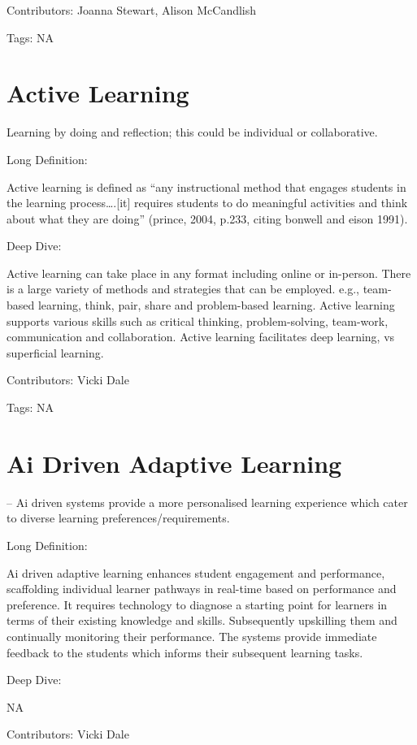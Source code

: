 \documentclass[
  letterpaper,
  DIV=11,
  numbers=noendperiod]{scrreprt}
\begin{document}
Contributors: Joanna Stewart, Alison McCandlish

Tags: NA

\section{Active Learning}\label{active-learning}

Learning by doing and reflection; this could be individual or
collaborative.

Long Definition:

Active learning is defined as ``any instructional method that engages
students in the learning process\ldots.{[}it{]} requires students to do
meaningful activities and think about what they are doing'' (prince,
2004, p.233, citing bonwell and eison 1991).

Deep Dive:

Active learning can take place in any format including online or
in-person. There is a large variety of methods and strategies that can
be employed. e.g., team-based learning, think, pair, share and
problem-based learning. Active learning supports various skills such as
critical thinking, problem-solving, team-work, communication and
collaboration. Active learning facilitates deep learning, vs superficial
learning.

Contributors: Vicki Dale

Tags: NA

\section{Ai Driven Adaptive Learning}\label{ai-driven-adaptive-learning}

-- Ai driven systems provide a more personalised learning experience
which cater to diverse learning preferences/requirements.

Long Definition:

Ai driven adaptive learning enhances student engagement and performance,
scaffolding individual learner pathways in real-time based on
performance and preference. It requires technology to diagnose a
starting point for learners in terms of their existing knowledge and
skills. Subsequently upskilling them and continually monitoring their
performance. The systems provide immediate feedback to the students
which informs their subsequent learning tasks.

Deep Dive:

NA

Contributors: Vicki Dale
\end{document}
